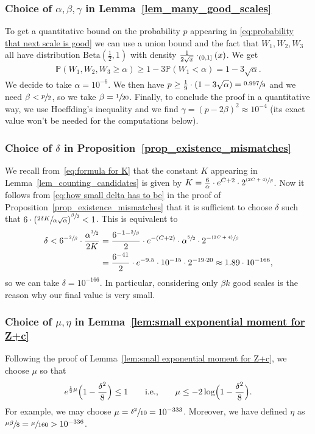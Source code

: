 \documentclass[11pt]{article}
\makeatletter
\newcommand{\ie}{i.e.,\xspace}
\newcommand{\psfrac}[2]{\sfrac{(#1)}{#2}}
\DeclareRobustCommand{\mathbbm}[1]{\csname jepbb@#1\endcsname}
\newcommand{\Pp}[1]{\mathbb{P} \left(#1\right)}
\newcommand{\intervalle}[4]{\mathopen{#1}#2\mathclose{}\mathpunct{},#3\mathclose{#4}}
\newcommand{\intervalleof}[2]{\intervalle{(}{#1}{#2}{]}}
\theoremstyle{plain}
\theoremstyle{definition}
\numberwithin{equation}{section}
\makeatother
\begin{document}
\subsubsection*{Choice of $\alpha,\beta,\gamma$ in Lemma~\ref{lem_many_good_scales}}
To get a quantitative bound on the probability $p$ appearing in \eqref{eq:probability that next scale is good} we can use a union bound and the fact that $W_1, W_2,W_3$ all have distribution $\mathrm{Beta}(\frac{1}{2},1)$ with density $\frac{1}{2\sqrt{x}}\cdot \mathbbm{1}_{\intervalleof{0}{1}}(x)$. We get
\begin{align*}
\Pp{W_1, W_2,W_3 \geq \alpha} \geq 1 - 3 \Pp{W_1 <\alpha} = 1 - 3\sqrt{\alpha}.
\end{align*}
We decide to take $\alpha = 10^{-6}$. We then have $p\geq \frac{1}{9}\cdot (1 - 3\sqrt{\alpha})=\sfrac{0.997}{9}$ and we need $\beta< \sfrac{p}{2}$, so we take $\beta=\sfrac{1}{20}$.
Finally, to conclude the proof in a quantitative way, we use Hoeffding's inequality and we find $\gamma=(p-2\beta)^2 \approx 10^{-4}$ (its exact value won't be needed for the computations below).

\subsubsection*{Choice of $\delta$ in Proposition~\ref{prop_existence_mismatches}}
We recall from~\eqref{eq:formula for K} that the constant $K$ appearing in Lemma~\ref{lem_counting_candidates} is
given by $K=\frac{6}{\alpha} \cdot e^{C+2} \cdot 2^{\psfrac{2C+4}{\beta}}$.
Now it follows from \eqref{eq:how small delta has to be} in the proof of Proposition~\ref{prop_existence_mismatches} that it is sufficient to choose $\delta$ such that
$6 \cdot \left( \sfrac{2\delta K}{\alpha\sqrt{\alpha}} \right)^{\sfrac{\beta}{2}}<1$.
This is equivalent to
\begin{align*}
\delta < 6^{-\sfrac{2}{\beta}}\cdot\frac{\alpha^{\sfrac{3}{2}}}{2 K}&= \frac{6^{-1-\sfrac{2}{\beta}}}{2}\cdot e^{-(C+2)}\cdot \alpha^{\sfrac{5}{2}} \cdot 2^{-\psfrac{2C+4}{\beta}}
\\&= \frac{6^{-41}}{2} \cdot e^{-9.5}\cdot 10^{-15} \cdot 2^{-19\cdot 20} \approx 1.89 \cdot 10^{-166},
\end{align*}
so we can take $\delta = 10^{-166}$. In particular, considering only $\beta k$ good scales is the reason why our final value is very small.

\subsubsection*{Choice of $\mu, \eta$ in Lemma~\ref{lem:small exponential moment for Z+c}}
Following the proof of Lemma~\ref{lem:small exponential moment for Z+c}, we choose $\mu$ so that
\begin{align*}
e^{\frac12 \mu} \Bigl( 1-\frac{\delta^2}{8} \Bigr) \leq 1 \qquad \text{\ie} \qquad \mu \leq -2 \log \Bigl( 1-\frac{\delta^2}{8} \Bigl).
\end{align*}
For example, we may choose $\mu = \sfrac{\delta^2}{10}=10^{-333}$. Moreover, we have defined $\eta$ as $\sfrac{\mu \beta}{8}=\sfrac{\mu}{160}>10^{-336}$.
\end{document}
